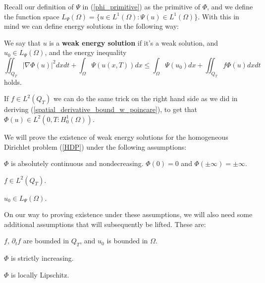 \documentclass[11pt, a4paper]{article}
\begin{document}
Recall our definition of $\Psi$ in (\ref{phi_primitive}) as the primitive of $\Phi$,
and we define the function space $L_\Psi(\Omega) = \{ u\in L^1(\Omega): \Psi(u)\in L^1(\Omega)\}$.
With this in mind we can define energy solutions in the following way:
\begin{mydef}
We say that $u$ is a \textbf{weak energy solution} if it's a weak solution, and $u_0 \in L_\Psi(\Omega)$, and the energy inequality
\begin{equation}
\label{energy_ineq}
\iint_{Q_T} |\nabla \Phi(u)|^2 dxdt + \int_\Omega \Psi(u(x,T))dx \leq \int_\Omega \Psi(u_0)dx + \iint_{Q_T}f\Phi(u)dxdt
\end{equation}
holds.
\end{mydef}
\setcounter{obs}{0}
\begin{obs}
If $f\in L^2(Q_T)$ we can do the same trick on the right hand side as we did in deriving (\ref{spatial_derivative_bound_w_poincare}), to get that $\Phi(u) \in L^2(0,T: H^1_0(\Omega))$.
\end{obs}

We will prove the existence of weak energy solutions for the homogeneous Dirichlet problem (\ref{HDP}) under the following assumptions:
\begin{assumption}
\label{ass:Phi_general}
$\Phi$ is absolutely continuous and nondecreasing. $\Phi(0) = 0$ and $\Phi(\pm \infty) = \pm \infty$.
\end{assumption}

\begin{assumption}
\label{ass:f}
$f \in L^2(Q_T)$.
\end{assumption}

\begin{assumption}
\label{ass:u_0}
$u_0 \in L_{\Psi}(\Omega)$.
\end{assumption}

On our way to proving existence under these assumptions, we will also need some additional assumptions that will subsequently be lifted. These are:
\begin{assumption}
\label{ass:f_ft_u_0_bounded}
$f$, $\partial_t f$ are bounded in $Q_T$, and $u_0$ is bounded in $\Omega$.
\end{assumption}

\begin{assumption}
\label{ass:Phi_strictly_increasing}
$\Phi$ is strictly increasing.
\end{assumption}

\begin{assumption}
\label{ass:Phi_lipschitz}
$\Phi$ is locally Lipschitz.
\end{assumption}
\end{document}
